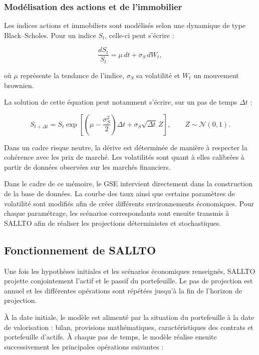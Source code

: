 \subsubsection*{Modélisation des actions et de l'immobilier}

Les indices actions et immobiliers sont modélisés selon une dynamique de type Black--Scholes. Pour un indice $S_t$, celle-ci peut s'écrire :

\begin{equation}
    \frac{dS_t}{S_t}
    =
    \mu\,dt+\sigma_S\,dW_t,
\end{equation}

où $\mu$ représente la tendance de l'indice, $\sigma_S$ sa volatilité et $W_t$ un mouvement brownien.

La solution de cette équation peut notamment s'écrire, sur un pas de temps $\Delta t$ :

\begin{equation}
    S_{t+\Delta t}
    =
    S_t
    \exp\left[
        \left(\mu-\frac{\sigma_S^2}{2}\right)\Delta t
        +\sigma_S\sqrt{\Delta t}\,Z
    \right],
    \qquad Z\sim\mathcal{N}(0,1).
\end{equation}

Dans un cadre risque neutre, la dérive est déterminée de manière à respecter la cohérence avec les prix de marché. Les volatilités sont quant à elles calibrées à partir de données observées sur les marchés financiers.

Dans le cadre de ce mémoire, le GSE intervient directement dans la construction de la base de données. La courbe des taux ainsi que certains paramètres de volatilité sont modifiés afin de créer différents environnements économiques. Pour chaque paramétrage, les scénarios correspondants sont ensuite transmis à SALLTO afin de réaliser les projections déterministes et stochastiques.


\subsection{Fonctionnement de SALLTO}

Une fois les hypothèses initiales et les scénarios économiques renseignés, SALLTO projette conjointement l'actif et le passif du portefeuille. Le pas de projection est annuel et les différentes opérations sont répétées jusqu'à la fin de l'horizon de projection.

À la date initiale, le modèle est alimenté par la situation du portefeuille à la date de valorisation : bilan, provisions mathématiques, caractéristiques des contrats et portefeuille d'actifs. À chaque pas de temps, le modèle réalise ensuite successivement les principales opérations suivantes :

